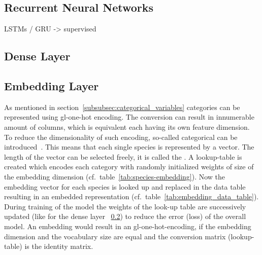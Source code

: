 
\subsection{Recurrent Neural Networks}
\label{subsec:rnn}

LSTMs / GRU -> supervised

\subsection{Dense Layer}
\label{subsec:dense-layer}

\subsection{Embedding Layer}
\label{subsec:embedding-layer}

As mentioned in section~\ref{subsubsec:categorical_variables} categories can be represented using \gls{gl-one-hot} encoding.
The conversion can result in innumerable amount of columns, which is equivalent each having its own feature dimension.
To reduce the dimensionality of such encoding, so-called categorical  can be introduced~\cite{brownlee2021}.
This means that each single species is represented by a vector.
The length of the vector can be selected freely, it is called the .
A lookup-table is created which encodes each category with randomly initialized weights of size of the embedding dimension (cf.\ table~\ref{tab:species-embedding}).
Now the embedding vector for each species is looked up and replaced in the data table resulting in an embedded representation (cf.\ table~\ref{tab:embedding_data_table}).
During training of the model the weights of the look-up table are successively updated (like for the dense layer ~\ref{subsec:dense-layer}) to reduce the error (loss) of the overall model.
An embedding would result in an \gls{gl-one-hot}-encoding, if the embedding dimension and the vocabulary size are equal and the conversion matrix (lookup-table) is the identity matrix.

